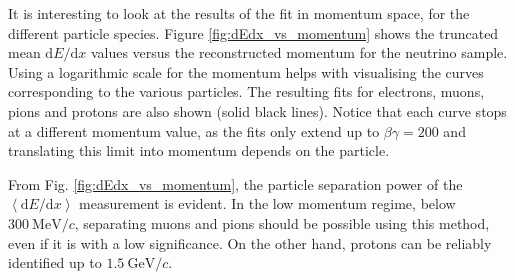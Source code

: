 It is interesting to look at the results of the fit in momentum space, for the different particle species. Figure \ref{fig:dEdx_vs_momentum} shows the truncated mean $\mathrm{d}E/\mathrm{d}x$ values versus the reconstructed momentum for the neutrino sample. Using a logarithmic scale for the momentum helps with visualising the curves corresponding to the various particles. The resulting fits for electrons, muons, pions and protons are also shown (solid black lines). Notice that each curve stops at a different momentum value, as the fits only extend up to $\beta\gamma = 200$ and translating this limit into momentum depends on the particle.

From Fig. \ref{fig:dEdx_vs_momentum}, the particle separation power of the $\left<\mathrm{d}E/\mathrm{d}x\right>$ measurement is evident. In the low momentum regime, below $300~\mathrm{MeV}/c$, separating muons and pions should be possible using this method, even if it is with a low significance. On the other hand, protons can be reliably identified up to $1.5~\mathrm{GeV}/c$.

